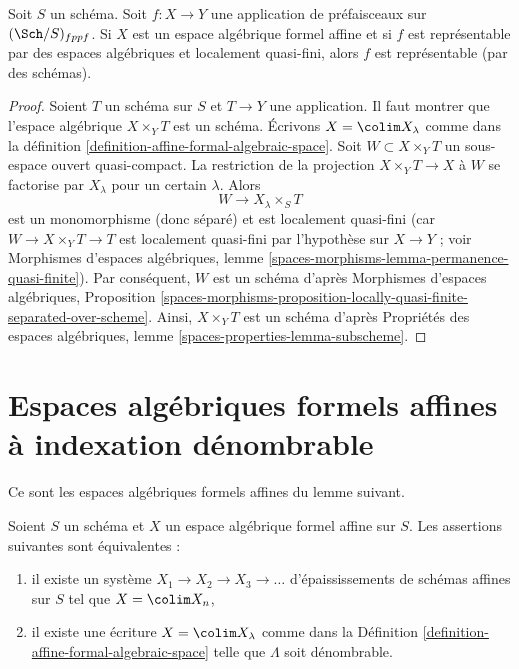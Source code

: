 \begin{lemma}
\label{lemma-presentation-representable}
Soit $S$ un schéma. Soit $f : X \to Y$ une application
de préfaisceaux sur $(\Sch/S)_{fppf}$. Si $X$ est un espace algébrique formel
affine et si $f$ est représentable par des espaces algébriques et localement quasi-fini,
alors $f$ est représentable (par des schémas).
\end{lemma}

\begin{proof}
Soient $T$ un schéma sur $S$ et $T \to Y$ une application. Il faut montrer que
l'espace algébrique $X \times_Y T$ est un schéma. Écrivons $X = \colim X_\lambda$
comme dans la définition
\ref{definition-affine-formal-algebraic-space}.
Soit $W \subset X \times_Y T$
un sous-espace ouvert quasi-compact. La restriction de la projection
$X \times_Y T \to X$ à $W$ se factorise par $X_\lambda$ pour un certain $\lambda$.
Alors
$$
W \to X_\lambda \times_S T
$$
est un monomorphisme (donc séparé) et est localement quasi-fini (car
$W \to X \times_Y T \to T$ est localement quasi-fini par l'hypothèse
sur $X \to Y$ ; voir Morphismes d'espaces algébriques, lemme
\ref{spaces-morphisms-lemma-permanence-quasi-finite}).
Par conséquent, $W$ est un schéma d'après
Morphismes d'espaces algébriques, Proposition
\ref{spaces-morphisms-proposition-locally-quasi-finite-separated-over-scheme}.
Ainsi, $X \times_Y T$ est un schéma d'après
Propriétés des espaces algébriques, lemme \ref{spaces-properties-lemma-subscheme}.
\end{proof}






\section{Espaces algébriques formels affines à indexation dénombrable}
\label{section-countably-indexed}

\noindent
Ce sont les espaces algébriques formels affines du lemme suivant.

\begin{lemma}
\label{lemma-countable-affine-formal-algebraic-space}
Soient $S$ un schéma et $X$ un espace algébrique formel affine sur $S$.
Les assertions suivantes sont équivalentes :
\begin{enumerate}
\item il existe un système $X_1 \to X_2 \to X_3 \to \ldots$
d'épaississements de schémas affines sur $S$ tel que $X = \colim X_n$,
\item il existe une écriture $X = \colim X_\lambda$ comme dans la
Définition \ref{definition-affine-formal-algebraic-space}
telle que $\Lambda$ soit dénombrable.
\end{enumerate}
\end{lemma}

